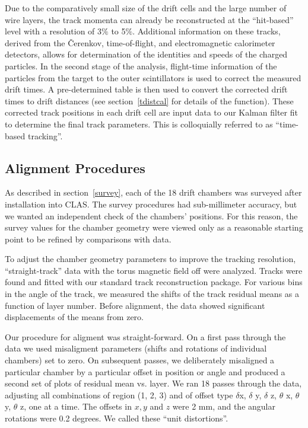 Due to the comparatively small size of the drift cells and the large 
number of wire layers, the track momenta can already be reconstructed 
at the ``hit-based'' level with a 
resolution of 3$\%$ to 5$\%$.  Additional information on these tracks, derived
from the {\v C}erenkov, time-of-flight, and electromagnetic calorimeter 
detectors, allows for determination of the identities and speeds of the 
charged particles.  In the second stage of the analysis, flight-time 
information of the particles from the target to the outer scintillators is 
used to correct the measured drift times.  A pre-determined table is then used
to convert the corrected drift times to drift distances (see section~\ref{tdistcal} 
for details of the function). These corrected 
track positions in each drift cell are input data to our Kalman filter
fit to determine the final track parameters.  This is colloquially referred
to as ``time-based tracking''.

\subsection{Alignment Procedures}
\label{align}

\hskip 0.15in
As described in section~\ref{survey}, each of the 18 drift chambers was 
surveyed after installation into CLAS.  The survey procedures had sub-millimeter
accuracy, but we wanted an independent check of the chambers' positions.  For 
this reason, the survey values for the chamber geometry were viewed only as 
a reasonable starting point to be refined by comparisons with data.

To adjust the chamber geometry parameters to improve the tracking resolution,
``straight-track'' data with the torus magnetic field off were analyzed.  
Tracks were found and fitted with our standard track reconstruction package.
For various bins in the angle of the track, we measured the shifts of the
track residual means as a function of layer number. 
Before alignment, the data showed significant displacements of the means
from zero.  

Our procedure for aligment was straight-forward.  On a first pass through
the data we used misaligment parameters (shifts and rotations of individual
chambers) set to zero.  On subsequent passes, we deliberately misaligned
a particular chamber by a particular offset in position or angle and 
produced a second set of plots of residual mean vs. layer.  We ran 18 passes
through the data, adjusting all combinations of region (1, 2, 3) and
of offset type $\delta$x, $\delta$ y, $\delta$ z, $\theta$ x, 
$\theta$ y, $\theta$ z, one at
a time.  The offsets in $x, y$ and $z$ were 2 mm, and the angular rotations
were 0.2 degrees.  We called these ``unit distortions''.

